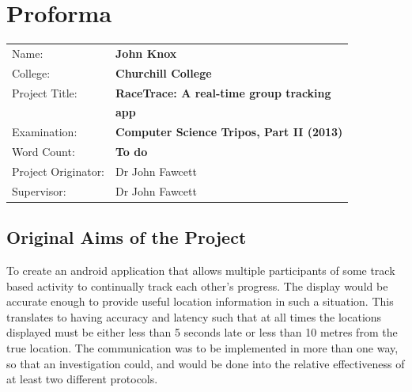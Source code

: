 \cleardoublepage


\setcounter{page}{1}
\pagestyle{plain}

\chapter*{Proforma}

{\large
\begin{tabular}{ll}
Name:               & \bf John Knox                                 \\
College:            & \bf Churchill College                         \\
Project Title:      & \bf RaceTrace: A real-time group tracking                   \\
                    & \bf app                        \\
Examination:        & \bf Computer Science Tripos, Part II (2013)   \\
Word Count:         & \bf To do\footnotemark[1]                     \\
Project Originator: & Dr John Fawcett                               \\
Supervisor:         & Dr John Fawcett                               \\ 
\end{tabular}
}


\section*{Original Aims of the Project}

To create an android application that allows multiple participants of some track based activity to continually track each other's progress. The display would be accurate enough to provide useful location information in such a situation. This translates to having accuracy and latency such that at all times the locations displayed must be either less than 5 seconds late or less than 10 metres from the true location.
The communication was to be implemented in more than one way, so that an investigation could, and would be done into the relative effectiveness of at least two different protocols.


